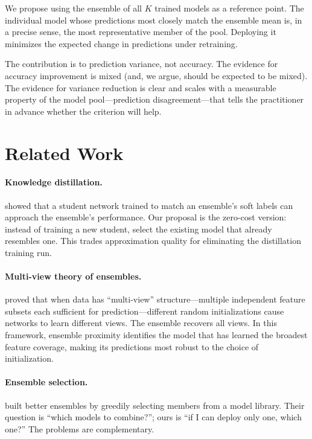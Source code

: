 \documentclass[11pt]{article}
\begin{document}
We propose using the ensemble of all $K$ trained models as a reference point.
The individual model whose predictions most closely match the ensemble mean is, in a precise sense, the most representative member of the pool.
Deploying it minimizes the expected change in predictions under retraining.

The contribution is to prediction variance, not accuracy.
The evidence for accuracy improvement is mixed (and, we argue, should be expected to be mixed).
The evidence for variance reduction is clear and scales with a measurable property of the model pool---prediction disagreement---that tells the practitioner in advance whether the criterion will help.


\section{Related Work}
\label{sec:related}

\paragraph{Knowledge distillation.}
\citet{hinton2015distilling} showed that a student network trained to match an ensemble's soft labels can approach the ensemble's performance.
Our proposal is the zero-cost version: instead of training a new student, select the existing model that already resembles one.
This trades approximation quality for eliminating the distillation training run.

\paragraph{Multi-view theory of ensembles.}
\citet{allenzhu2023ensemble} proved that when data has ``multi-view'' structure---multiple independent feature subsets each sufficient for prediction---different random initializations cause networks to learn different views.
The ensemble recovers all views.
In this framework, ensemble proximity identifies the model that has learned the broadest feature coverage, making its predictions most robust to the choice of initialization.

\paragraph{Ensemble selection.}
\citet{caruana2004ensemble} built better ensembles by greedily selecting members from a model library.
Their question is ``which models to combine?''; ours is ``if I can deploy only one, which one?''
The problems are complementary.
\end{document}
